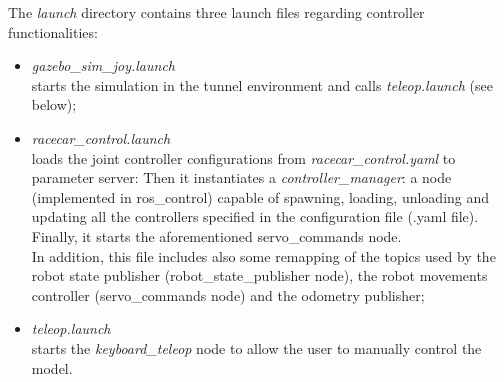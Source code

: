 The \textit{launch} directory contains three launch files regarding controller functionalities:
\begin{itemize}
    \item \textit{gazebo\_sim\_joy.launch}\\
    starts the simulation in the tunnel environment and calls \textit{teleop.launch} (see below);
    \item \textit{racecar\_control.launch}\\
    loads the joint controller configurations from \textit{racecar\_control.yaml} to parameter server:
    Then it instantiates a \textit{controller\_manager}: a node (implemented in ros\_control) capable of spawning, loading, 
    unloading and updating all the controllers specified in the configuration file (.yaml file).
    Finally, it starts the aforementioned servo\_commands node. \\
    In addition, this file includes also some remapping of the topics used by the robot state publisher 
    (robot\_state\_publisher node), the robot movements controller (servo\_commands node) and the odometry publisher;
    \item \textit{teleop.launch} \\
    starts the \textit{keyboard\_teleop} node to allow the user to manually control the model.
\end{itemize}